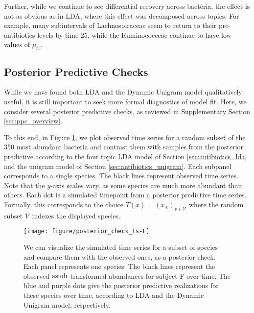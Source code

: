 \documentclass[oupdraft]{bio}
\begin{document}
Further, while we continue to see differential recovery across bacteria, the
effect is not as obvious as in LDA, where this effect was decomposed across
topics. For example, many subintervals of Lachnospiraceae seem to return to
their pre-antibiotics levels by time 25, while the Ruminococceae continue to
have low values of $\mu_{tv}$.

\subsection{Posterior Predictive Checks}
\label{sec:antibiotics_ppc}

While we have found both LDA and the Dynamic Unigram model qualitatively useful,
it is still important to seek more formal diagnostics of model fit. Here, we
consider several posterior predictive checks, as reviewed in Supplementary
Section \ref{sec:ppc_overview}.

To this end, in Figure \ref{fig:antibiotics_posterior_ts}, we plot observed time
series for a random subset of the 350 most abundant bacteria and contrast them
with samples from the posterior predictive according to the four topic LDA model
of Section \ref{sec:antibiotics_lda} and the unigram model of Section
\ref{sec:antibiotics_unigram}. Each subpanel corresponds to a single species. The
black lines represent observed time series. Note that the $y$-axis scales vary,
as some species are much more abundant than others. Each dot is a simulated
timepoint from a posterior predictive time series. Formally, this corresponds to
the choice $T\left(x\right) = \left(x_{\cdot v}\right)_{v \in \mathcal{V}}$
where the random subset $\mathcal{V}$ indexes the displayed species.

\begin{figure}
  \centering
  \texttt{[image: figure/posterior\_check\_ts-F]}
  \caption{We can visualize the simulated time series for a subset of species
    and compare them with the observed ones, as a posterior check. Each panel
    represents one species. The black lines represent the observed
    $\mathop\mathrm{asinh}$-transformed abundances for subject F over time. The blue and purple
    dots give the posterior predictive realizations for these species over time,
    according to LDA and the Dynamic Unigram model, respectively.
    \label{fig:antibiotics_posterior_ts}}
\end{figure}
\end{document}
